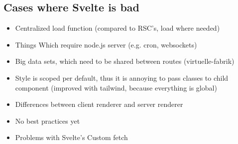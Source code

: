 \subsection{Cases where Svelte is bad}

\begin{itemize}
    \item Centralized load function (compared to RSC's, load where needed)
    \item Things Which require node.js server (e.g. cron, websockets)
    \item Big data sets, which need to be shared between routes (virtuelle-fabrik)
    \item Style is scoped per default, thus it is annoying to pass classes to child component (improved with tailwind, because everything is global)
    \item Differences between client renderer and server renderer
    \item No best practices yet
    \item Problems with Svelte's Custom fetch
\end{itemize}



